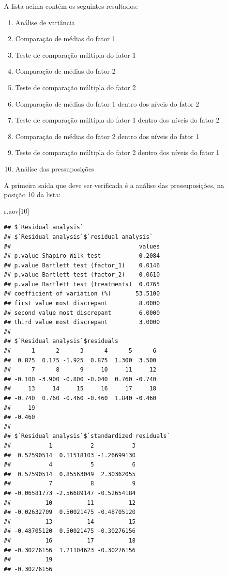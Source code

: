 \documentclass[
]{article}
\newenvironment{Shaded}{\begin{snugshade}}{\end{snugshade}}
\newcommand{\DecValTok}[1]{\textcolor[rgb]{0.00,0.00,0.81}{#1}}
\newcommand{\NormalTok}[1]{#1}
\providecommand{\tightlist}{%
  \setlength{\itemsep}{0pt}\setlength{\parskip}{0pt}}
\begin{document}
A lista acima contém os seguintes resultados:

\begin{enumerate}
\def\labelenumi{\arabic{enumi}.}
\tightlist
\item
  Análise de variância
\item
  Comparação de médias do fator 1
\item
  Teste de comparação múltipla do fator 1
\item
  Comparação de médias do fator 2\\
\item
  Teste de comparação múltipla do fator 2
\item
  Comparação de médias do fator 1 dentro dos níveis do fator 2
\item
  Teste de comparação múltipla do fator 1 dentro dos níveis do fator 2
\item
  Comparação de médias do fator 2 dentro dos níveis do fator 1
\item
  Teste de comparação múltipla do fator 2 dentro dos níveis do fator 1
\item
  Análise das pressuposições
\end{enumerate}

A primeira saída que deve ser verificada é a análise das pressuposições, na posição 10 da lista:

\begin{Shaded}
\begin{Highlighting}[]
\NormalTok{r.aov[}\DecValTok{10}\NormalTok{]}
\end{Highlighting}
\end{Shaded}

\begin{verbatim}
## $`Residual analysis`
## $`Residual analysis`$`residual analysis`
##                                     values
## p.value Shapiro-Wilk test           0.2084
## p.value Bartlett test (factor_1)    0.0146
## p.value Bartlett test (factor_2)    0.0610
## p.value Bartlett test (treatments)  0.0765
## coefficient of variation (%)       53.5100
## first value most discrepant         8.0000
## second value most discrepant        6.0000
## third value most discrepant         3.0000
## 
## $`Residual analysis`$residuals
##      1      2      3      4      5      6 
##  0.875  0.175 -1.925  0.875  1.300  3.500 
##      7      8      9     10     11     12 
## -0.100 -3.900 -0.800 -0.040  0.760 -0.740 
##     13     14     15     16     17     18 
## -0.740  0.760 -0.460 -0.460  1.840 -0.460 
##     19 
## -0.460 
## 
## $`Residual analysis`$`standardized residuals`
##           1           2           3 
##  0.57590514  0.11518103 -1.26699130 
##           4           5           6 
##  0.57590514  0.85563049  2.30362055 
##           7           8           9 
## -0.06581773 -2.56689147 -0.52654184 
##          10          11          12 
## -0.02632709  0.50021475 -0.48705120 
##          13          14          15 
## -0.48705120  0.50021475 -0.30276156 
##          16          17          18 
## -0.30276156  1.21104623 -0.30276156 
##          19 
## -0.30276156
\end{verbatim}
\end{document}
